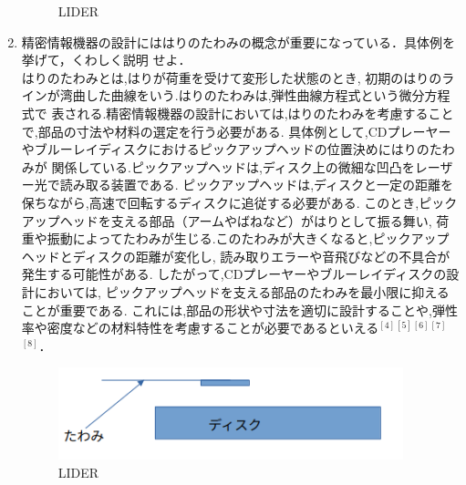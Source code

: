 \documentclass[a4paper,11pt]{jsarticle}
\begin{document}
\begin{enumerate}
\begin{figure}[h]
  \centering
  \caption{LIDER}
\end{figure}
\clearpage
\item 精密情報機器の設計にははりのたわみの概念が重要になっている．具体例を挙げて，くわしく説明
せよ．\\
\quad はりのたわみとは,はりが荷重を受けて変形した状態のとき,
初期のはりのラインが湾曲した曲線をいう.はりのたわみは,弾性曲線方程式という微分方程式で
表される.精密情報機器の設計においては,はりのたわみを考慮することで,部品の寸法や材料の選定を行う必要がある.
具体例として,CDプレーヤーやブルーレイディスクにおけるピックアップヘッドの位置決めにはりのたわみが
関係している.ピックアップヘッドは,ディスク上の微細な凹凸をレーザー光で読み取る装置である.
ピックアップヘッドは,ディスクと一定の距離を保ちながら,高速で回転するディスクに追従する必要がある.
このとき,ピックアップヘッドを支える部品（アームやばねなど）がはりとして振る舞い,
荷重や振動によってたわみが生じる.このたわみが大きくなると,ピックアップヘッドとディスクの距離が変化し,
読み取りエラーや音飛びなどの不具合が発生する可能性がある.
したがって,CDプレーヤーやブルーレイディスクの設計においては,
ピックアップヘッドを支える部品のたわみを最小限に抑えることが重要である.
これには,部品の形状や寸法を適切に設計することや,弾性率や密度などの材料特性を考慮することが必要であるといえる$^{[4]}$$^{[5]}$$^{[6]}$$^{[7]}$$^{[8]}$．
\begin{figure}[h]
  \centering
  \includegraphics[width=10cm]{8.png}
  \caption{LIDER}
\end{figure}

\end{enumerate}
\end{document}
